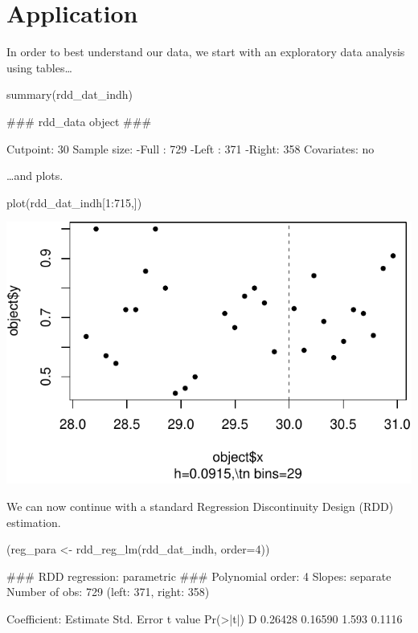 \documentclass[article]{jss}
\begin{document}
\section{Application}\label{application}

In order to best understand our data, we start with an exploratory data
analysis using tables\ldots{}

\begin{CodeChunk}
\begin{CodeInput}
summary(rdd_dat_indh)
\end{CodeInput}
\begin{CodeOutput}
### rdd_data object ###

Cutpoint: 30 
Sample size: 
    -Full : 729 
    -Left : 371 
    -Right: 358
Covariates: no 
\end{CodeOutput}
\end{CodeChunk}

\ldots{}and plots.

\begin{CodeChunk}
\begin{CodeInput}
plot(rdd_dat_indh[1:715,])
\end{CodeInput}


\begin{center}\includegraphics{README_files/figure-latex/unnamed-chunk-7-1} \end{center}

\end{CodeChunk}

We can now continue with a standard Regression Discontinuity Design
(RDD) estimation.

\begin{CodeChunk}
\begin{CodeInput}
(reg_para <- rdd_reg_lm(rdd_dat_indh, order=4))
\end{CodeInput}
\begin{CodeOutput}
### RDD regression: parametric ###
    Polynomial order:  4 
    Slopes:  separate 
    Number of obs: 729 (left: 371, right: 358)

    Coefficient:
  Estimate Std. Error t value Pr(>|t|)
D  0.26428    0.16590   1.593   0.1116
\end{CodeOutput}
\end{CodeChunk}
\end{document}
